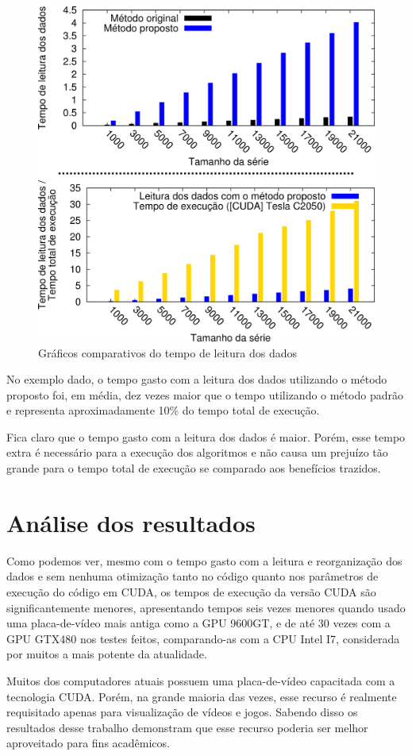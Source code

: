 \begin{figure}[H]
\centering
\includegraphics[]{Imagens/grafico_tempo_leitura/lanczos_tempos_leitura.png}
\caption{Gráficos comparativos do tempo de leitura dos dados}
\label{fig:grafico_tempos_leitura}
\end{figure}

No exemplo dado, o tempo gasto com a leitura dos dados utilizando o método proposto foi, em média, dez vezes maior que o tempo utilizando o método padrão e representa aproximadamente 10\% do tempo total de execução.

Fica claro que o tempo gasto com a leitura dos dados é maior. Porém, esse tempo extra é necessário para a execução dos algoritmos e não causa um prejuízo tão grande para o tempo total de execução se comparado aos benefícios trazidos.

\section{Análise dos resultados}

Como podemos ver, mesmo com o tempo gasto com a leitura e reorganização dos dados e sem nenhuma otimização tanto no código quanto nos parâmetros de execução do código em CUDA, os tempos de execução da versão CUDA são significantemente menores, apresentando tempos seis vezes menores quando usado uma placa-de-vídeo mais antiga como a GPU 9600GT, e de até 30 vezes com a GPU GTX480 nos testes feitos, comparando-as com a CPU Intel I7, considerada por muitos a mais potente da atualidade.

Muitos dos computadores atuais possuem uma placa-de-vídeo capacitada com a tecnologia CUDA. Porém, na grande maioria das vezes, esse recurso é realmente requisitado apenas para visualização de vídeos e jogos. Sabendo disso os resultados desse trabalho demonstram que esse recurso poderia ser melhor aproveitado para fins acadêmicos.